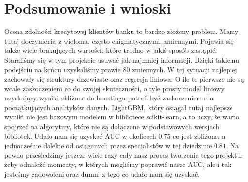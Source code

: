 \documentclass[12pt]{article}
\begin{document}
\newpage
	
\section{Podsumowanie i wnioski}

Ocena zdolności kredytowej klientów banku to bardzo złożony problem. Mamy tutaj doczynienia z wieloma, często enigmatycznymi, zmiennymi. Pojawia się także wiele brakujących wartości, które trudno w jakiś sposób zastąpić. Staraliśmy się w tym projekcie usuwać jak najmniej informacji. Dzięki takiemu podejściu na końcu uzyskaliśmy prawie 80 zmiennych. W tej sytuacji najlepiej zachowały się struktury drzewiaste oraz regresja liniowa. O ile te pierwsze nie są wcale zaskoczeniem co do swojej skuteczności, o tyle prosty model liniowy uzyskujący wyniki zbliżone do boostingu potrafi być zaskoczeniem dla początkujących analityków danych. LightGBM, który osiągał tutaj najlepsze wyniki nie jest bazowym modelem w bibliotece scikit-learn, a to uczy, że warto spojrzeć na algorytmy, które nie są dołączone w podstawowych wersjach bibliotek. Udało nam się uzyskać AUC w okolicach $0.75$ co jest zbliżone, a jednocześnie dalekie od osiąganych przez specjalistów w tej dziedzinie $0.81$. Na pewno prześledzimy jeszcze wiele razy cały nasz proces tworzenia tego projektu, żeby odnaleźć momenty, w których mogliśmy poprawić nasze AUC, ale i tak jesteśmy zadowoleni oraz dumni z tego co udało nam się uzyskać.
\end{document}
